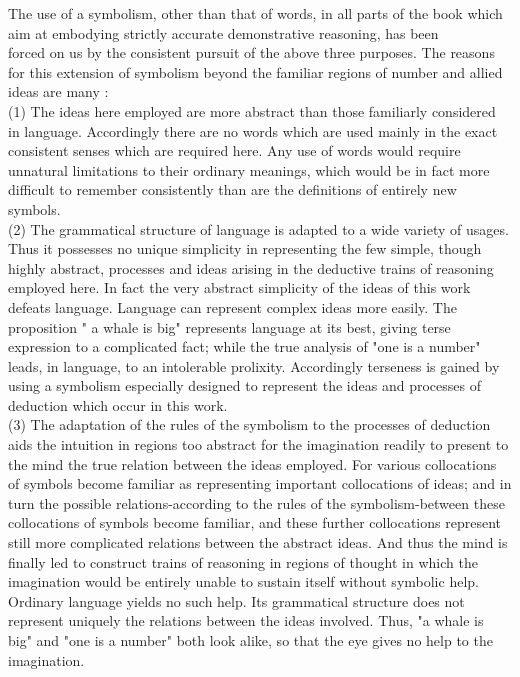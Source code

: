 \documentclass[10pt]{article}
\begin{document}
The use of a symbolism, other than that of words, in all parts of the book which aim at embodying strictly accurate demonstrative reasoning, has been\\
forced on us by the consistent pursuit of the above three purposes. The reasons for this extension of symbolism beyond the familiar regions of number and allied ideas are many :\\
(1) The ideas here employed are more abstract than those familiarly considered in language. Accordingly there are no words which are used mainly in the exact consistent senses which are required here. Any use of words would require unnatural limitations to their ordinary meanings, which would be in fact more difficult to remember consistently than are the definitions of entirely new symbols.\\
(2) The grammatical structure of language is adapted to a wide variety of usages. Thus it possesses no unique simplicity in representing the few simple, though highly abstract, processes and ideas arising in the deductive trains of reasoning employed here. In fact the very abstract simplicity of the ideas of this work defeats language. Language can represent complex ideas more easily. The proposition " a whale is big" represents language at its best, giving terse expression to a complicated fact; while the true analysis of "one is a number" leads, in language, to an intolerable prolixity. Accordingly terseness is gained by using a symbolism especially designed to represent the ideas and processes of deduction which occur in this work.\\
(3) The adaptation of the rules of the symbolism to the processes of deduction aids the intuition in regions too abstract for the imagination readily to present to the mind the true relation between the ideas employed. For various collocations of symbols become familiar as representing important collocations of ideas; and in turn the possible relations-according to the rules of the symbolism-between these collocations of symbols become familiar, and these further collocations represent still more complicated relations between the abstract ideas. And thus the mind is finally led to construct trains of reasoning in regions of thought in which the imagination would be entirely unable to sustain itself without symbolic help. Ordinary language yields no such help. Its grammatical structure does not represent uniquely the relations between the ideas involved. Thus, "a whale is big" and "one is a number" both look alike, so that the eye gives no help to the imagination.\\
\end{document}
